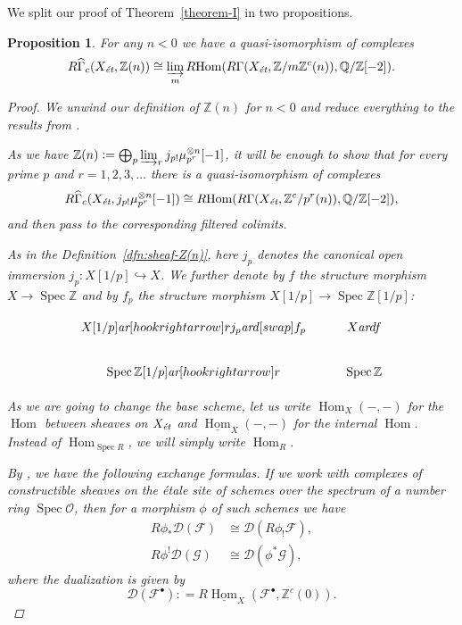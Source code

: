 \documentclass[draft,leqno,12pt]{article}
\theoremstyle{plain}
\newtheorem{proposition}[theorem]{\indent\sc Proposition}
\theoremstyle{definition}
\DeclareMathOperator{\Spec}{Spec}
\DeclareMathOperator{\Hom}{Hom}
\newcommand{\ZZ}{\mathbb{Z}}
\newcommand{\QQ}{\mathbb{Q}}
\newcommand{\dfn}{\mathrel{\mathop:}=}
\newcommand{\et}{\text{\it \'{e}t}}
\newcommand{\ar}{\text{\it ar}}
\newcommand{\iHom}{\underline{\Hom}}
\newcommand{\RHom}{R\!\Hom}
\begin{document}
We split our proof of Theorem~\ref{theorem-I} in two propositions.

\begin{proposition}
  For any $n < 0$ we have a quasi-isomorphism of complexes
  \begin{equation}
    \label{eqn:duality-quasi-isomorphism-1}
    R\widehat{\Gamma}_c (X_\et, \ZZ (n)) \cong
    \varinjlim_m \RHom (R\Gamma (X_\et, \ZZ/m\ZZ^c (n)), \QQ/\ZZ [-2]).
  \end{equation}

  \begin{proof}
    We unwind our definition of $\ZZ (n)$ for $n < 0$ and reduce everything to
    the results from \cite{Geisser-2010}.

    \vspace{1em}

    As we have
    $\ZZ (n) \dfn \bigoplus_p \varinjlim_r j_{p!} \mu_{p^r}^{\otimes n} [-1]$,
    it will be enough to show that for every prime $p$ and $r=1,2,3,\ldots$
    there is a quasi-isomorphism of complexes
    \[ R\widehat{\Gamma}_c (X_\et, j_{p!} \mu_{p^r}^{\otimes n} [-1]) \cong
    \RHom (R\Gamma (X_\et, \ZZ^c/p^r (n)), \QQ/\ZZ [-2]), \]
    and then pass to the corresponding filtered colimits.

    As in the Definition~\ref{dfn:sheaf-Z(n)}, here $j_p$ denotes the canonical
    open immersion $j_p\colon X[1/p] \hookrightarrow X$. We further denote by
    $f$ the structure morphism $X\to \Spec \ZZ$ and by $f_p$ the structure
    morphism $X [1/p] \to \Spec \ZZ [1/p]$:

    \[ \begin{tikzcd}
      X [1/p]\ar[hookrightarrow]{r}{j_p}\ar{d}[swap]{f_p} & X\ar{d}{f} \\
      \Spec \ZZ [1/p]\ar[hookrightarrow]{r} & \Spec \ZZ
    \end{tikzcd} \]

    As we are going to change the base scheme, let us write $\Hom_X (-,-)$ for
    the $\Hom$ between sheaves on $X_\et$ and $\iHom_X (-,-)$ for the
    internal $\Hom$. Instead of $\Hom_{\Spec R}$, we will simply write
    $\Hom_R$.

    By \cite[Proposition~7.10~(c)]{Geisser-2010}, we have the following
    exchange formulas. If we work with complexes of constructible sheaves on the
    \'{e}tale site of schemes over the spectrum of a number ring
    $\Spec\mathcal{O}$, then for a morphism $\phi$ of such schemes we have
    \begin{align}
      \label{eqn:exchange-formula-1} R \phi_* \mathcal{D} (\mathcal{F}) & \cong \mathcal{D} (R \phi_! \mathcal{F}),\\
      \label{eqn:exchange-formula-2} R \phi^! \mathcal{D} (\mathcal{G}) & \cong \mathcal{D} (\phi^* \mathcal{G}),
    \end{align}
    where the dualization is given by
    \[ \mathcal{D} (\mathcal{F}^\bullet) \dfn
    R\iHom_X (\mathcal{F}^\bullet, \ZZ^c (0)). \]


\end{proof}
\end{proposition}
\end{document}
